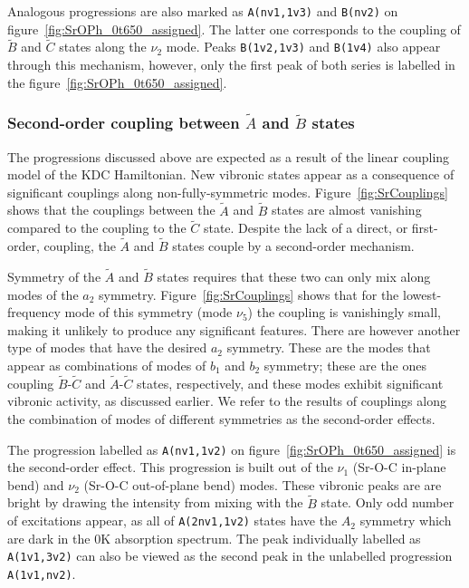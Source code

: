 \documentclass{article}
\begin{document}
Analogous progressions are also marked as \texttt{A(nv1,1v3)} and
\texttt{B(nv2)} on figure~\ref{fig:SrOPh_0t650_assigned}. The latter one
corresponds to the coupling of $\tilde{B}$ and $\tilde{C}$ states along the
$\nu _2$ mode. Peaks \texttt{B(1v2,1v3)} and \texttt{B(1v4)} also appear
through this mechanism, however, only the first peak of both series is labelled
in the figure~\ref{fig:SrOPh_0t650_assigned}.

\subsubsection{Second-order coupling between $\tilde{A}$ and $\tilde{B}$
states} 
\label{sec:results:simulations:2nd}

The progressions discussed above are expected as a result of the linear
coupling model of the KDC Hamiltonian. New vibronic states appear as a
consequence of significant couplings along non-fully-symmetric modes.
Figure~\ref{fig:SrCouplings} shows that the couplings between the $\tilde{A}$
and $\tilde{B}$ states are almost vanishing compared to the coupling to the
$\tilde{C}$ state. Despite the lack of a direct, or first-order, coupling, the
$\tilde{A}$ and $\tilde{B}$ states couple by a second-order mechanism. 

Symmetry of the $\tilde{A}$ and $\tilde{B}$ states requires that these two can
only mix along modes of the $a _2$ symmetry. Figure~\ref{fig:SrCouplings} shows
that for the lowest-frequency mode of this symmetry (mode $\nu _5$) the
coupling is vanishingly small, making it unlikely to produce any significant
features. There are however another type of modes that have the desired $a _2$
symmetry. These are the modes that appear as combinations of modes of $b _1$
and $b _2$ symmetry; these are the ones coupling $\tilde{B}$-$\tilde{C}$ and
$\tilde{A}$-$\tilde{C}$ states, respectively, and these modes exhibit
significant vibronic activity, as discussed earlier. We refer to the results of
couplings along the combination of modes of different symmetries as the
second-order effects.

The progression labelled as \texttt{A(nv1,1v2)} on
figure~\ref{fig:SrOPh_0t650_assigned} is the second-order effect. This
progression is built out of the $\nu _1$ (Sr-O-C in-plane bend) and $\nu _2$
(Sr-O-C out-of-plane bend) modes. These vibronic peaks are are bright by
drawing the intensity from mixing with the $\tilde{B}$ state. Only odd number
of excitations appear, as all of \texttt{A(2nv1,1v2)} states have the $A _2$
symmetry which are dark in the 0K absorption spectrum. The peak individually
labelled as \texttt{A(1v1,3v2)} can also be viewed as the second peak in the
unlabelled progression \texttt{A(1v1,nv2)}.
\end{document}
